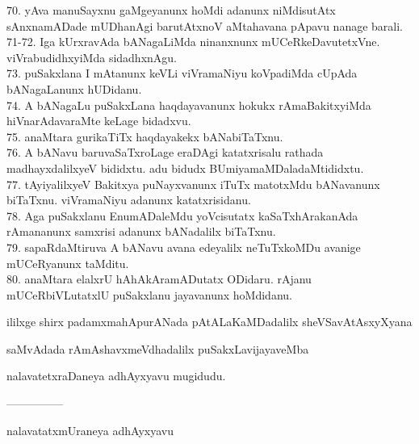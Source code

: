 \documentclass{article}
\begin{document}
70. yAva manuSayxnu gaMgeyanunx hoMdi adanunx niMdisutAtx sAnxnamADade mUDhanAgi barutAtxnoV aMtahavana pApavu nanage barali.\\
71-72. Iga kUrxravAda bANagaLiMda ninanxnunx mUCeRkeDavutetxVne. viVrabudidhxyiMda sidadhxnAgu.\\
73. puSakxlana I mAtanunx keVLi viVramaNiyu koVpadiMda cUpAda bANagaLanunx hUDidanu.\\
74. A bANagaLu puSakxLana haqdayavanunx hokukx rAmaBakitxyiMda hiVnarAdavaraMte keLage bidadxvu.\\
75. anaMtara gurikaTiTx haqdayakekx bANabiTaTxnu.\\
76. A bANavu baruvaSaTxroLage eraDAgi katatxrisalu rathada madhayxdalilxyeV bididxtu. adu bidudx BUmiyamaMDaladaMtididxtu.\\
77. tAyiyalilxyeV Bakitxya puNayxvanunx iTuTx matotxMdu bANavanunx biTaTxnu. viVramaNiyu adanunx katatxrisidanu.\\
78. Aga puSakxlanu EnumADaleMdu yoVcisutatx kaSaTxhArakanAda rAmananunx samxrisi adanunx bANadalilx biTaTxnu.\\
79. sapaRdaMtiruva A bANavu avana edeyalilx neTuTxkoMDu avanige mUCeRyanunx taMditu.\\
80. anaMtara elalxrU hAhAkAramADutatx ODidaru. rAjanu mUCeRbiVLutatxlU puSakxlanu jayavanunx hoMdidanu.

\begin{center}
ililxge shirx padamxmahApurANada pAtALaKaMDadalilx sheVSavAtAsxyXyana
\end{center}

\begin{center}
saMvAdada rAmAshavxmeVdhadalilx puSakxLavijayaveMba
\end{center}

\begin{center}
nalavatetxraDaneya adhAyxyavu mugidudu.
\end{center}

\begin{center}
---------------
\end{center}

\begin{center}
nalavatatxmUraneya adhAyxyavu
\end{center}
\end{document}
